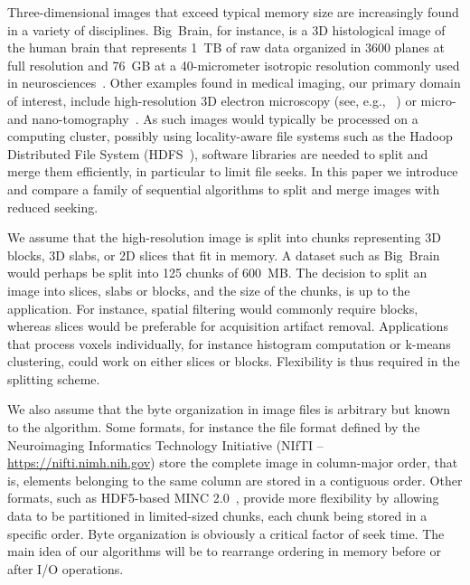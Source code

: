 \documentclass[10pt, conference, compsocconf]{IEEEtran}
\begin{document}
Three-dimensional images that exceed typical memory size are
increasingly found in a variety of disciplines. Big~Brain, for
instance, is a 3D histological image of the human brain that
represents 1~TB of raw data organized in 3600 planes at full
resolution and 76~GB at a 40-micrometer isotropic resolution commonly
used in neurosciences~\cite{amunts2013bigbrain}. Other examples found
in medical imaging, our primary domain of interest, include
high-resolution 3D electron microscopy (see, e.g.,
~\cite{bock2011network}) or micro- and
nano-tomography~\cite{10.1371/journal.pone.0035691}. As such images
would typically be processed on a computing cluster, possibly using
locality-aware file systems such as the Hadoop Distributed File System
(HDFS~\cite{shvachko2010hadoop}), software libraries are needed to
split and merge them efficiently, in particular to limit file
seeks. In this paper we introduce and compare a family of sequential
algorithms to split and merge images with reduced seeking.

We assume that the high-resolution image is split into chunks
representing 3D blocks, 3D slabs, or  2D slices that fit in memory. A dataset such
as Big~Brain would perhaps be split into 125 chunks of 600~MB. The
decision to split an image into slices, slabs or blocks, and the size of the
chunks, is up to the application. For instance, spatial filtering would
commonly require blocks, whereas slices would be preferable for acquisition artifact removal. 
Applications that process voxels individually, for instance
histogram computation or k-means clustering, could work on either
slices or blocks. Flexibility is thus required in the splitting
scheme.

We also assume that the byte organization in image files is arbitrary
but known to the algorithm. Some formats, for instance the file format
defined by the Neuroimaging Informatics Technology Initiative (NIfTI
-- \url{https://nifti.nimh.nih.gov}) store the complete image in
column-major order, that is, elements belonging to the same column are
stored in a contiguous order. Other formats, such as HDF5-based MINC
2.0~\cite{vincent2016minc}, provide more flexibility by allowing data
to be partitioned in limited-sized chunks, each chunk being stored in
a specific order. Byte organization is obviously a critical factor of
seek time. The main idea of our algorithms will be to rearrange
ordering in memory before or after I/O operations.
\end{document}

